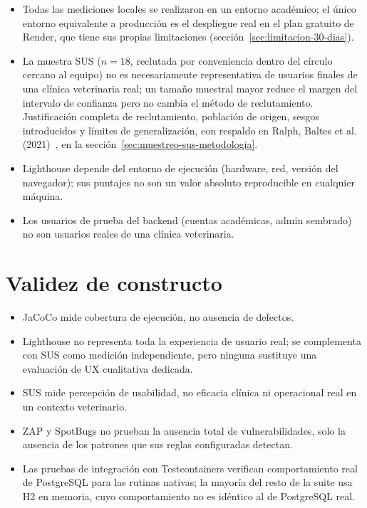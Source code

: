 \begin{itemize}[nosep]
  \item Todas las mediciones locales se realizaron en un entorno
    acad\'emico; el \'unico entorno equivalente a producci\'on es el
    despliegue real en el plan gratuito de Render, que tiene sus propias
    limitaciones (secci\'on~\ref{sec:limitacion-30-dias}).
  \item La muestra SUS ($n=18$, reclutada por conveniencia dentro del
    c\'irculo cercano al equipo) no es necesariamente representativa de
    usuarios finales de una cl\'inica veterinaria real; un tama\~no
    muestral mayor reduce el margen del intervalo de confianza pero no
    cambia el m\'etodo de reclutamiento. Justificaci\'on completa de
    reclutamiento, poblaci\'on de origen, sesgos introducidos y l\'imites
    de generalizaci\'on, con respaldo en Ralph, Baltes et al.
    (2021)~\cite{ralph2021-empirical-standards}, en la
    secci\'on~\ref{sec:muestreo-sus-metodologia}.
  \item Lighthouse depende del entorno de ejecuci\'on (hardware, red,
    versi\'on del navegador); sus puntajes no son un valor absoluto
    reproducible en cualquier m\'aquina.
  \item Los usuarios de prueba del backend (cuentas acad\'emicas, admin
    sembrado) no son usuarios reales de una cl\'inica veterinaria.
\end{itemize}

\section{Validez de constructo}

\begin{itemize}[nosep]
  \item JaCoCo mide cobertura de ejecuci\'on, no ausencia de defectos.
  \item Lighthouse no representa toda la experiencia de usuario real; se
    complementa con SUS como medici\'on independiente, pero ninguna
    sustituye una evaluaci\'on de UX cualitativa dedicada.
  \item SUS mide percepci\'on de usabilidad, no eficacia cl\'inica ni
    operacional real en un contexto veterinario.
  \item ZAP y SpotBugs no prueban la ausencia total de vulnerabilidades,
    solo la ausencia de los patrones que sus reglas configuradas detectan.
  \item Las pruebas de integraci\'on con Testcontainers verifican
    comportamiento real de PostgreSQL para las rutinas nativas; la mayor\'ia
    del resto de la suite usa H2 en memoria, cuyo comportamiento no es
    id\'entico al de PostgreSQL real.
\end{itemize}

